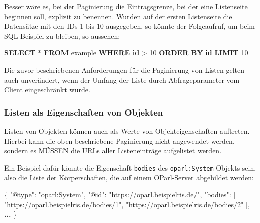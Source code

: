 \documentclass[,a4paper]{article}
\newenvironment{Shaded}{}{}
\newcommand{\KeywordTok}[1]{\textcolor[rgb]{0.00,0.44,0.13}{\textbf{{#1}}}}
\newcommand{\DataTypeTok}[1]{\textcolor[rgb]{0.56,0.13,0.00}{{#1}}}
\newcommand{\DecValTok}[1]{\textcolor[rgb]{0.25,0.63,0.44}{{#1}}}
\newcommand{\StringTok}[1]{\textcolor[rgb]{0.25,0.44,0.63}{{#1}}}
\newcommand{\OtherTok}[1]{\textcolor[rgb]{0.00,0.44,0.13}{{#1}}}
\newcommand{\FunctionTok}[1]{\textcolor[rgb]{0.02,0.16,0.49}{{#1}}}
\newcommand{\ErrorTok}[1]{\textcolor[rgb]{1.00,0.00,0.00}{\textbf{{#1}}}}
\newcommand{\NormalTok}[1]{{#1}}
\begin{document}
Besser wäre es, bei der Paginierung die Eintragsgrenze, bei der eine
Listenseite beginnen soll, explizit zu benennen. Wurden auf der ersten
Listenseite die Datensätze mit den IDs 1 bis 10 ausgegeben, so könnte
der Folgeaufruf, um beim SQL-Beispiel zu bleiben, so aussehen:

\begin{Shaded}
\begin{Highlighting}[]
\KeywordTok{SELECT} \NormalTok{* }\KeywordTok{FROM} \NormalTok{example }\KeywordTok{WHERE} \KeywordTok{id} \NormalTok{> }\DecValTok{10} \KeywordTok{ORDER} \KeywordTok{BY} \KeywordTok{id} \KeywordTok{LIMIT} \DecValTok{10}
\end{Highlighting}
\end{Shaded}

Die zuvor beschriebenen Anforderungen für die Paginierung von Listen
gelten auch unverändert, wenn der Umfang der Liste durch
Abfrageparameter vom Client eingeschränkt wurde.

\subsubsection{Listen als Eigenschaften von
Objekten}\label{listen-als-eigenschaften-von-objekten}

Listen von Objekten können auch als Werte von Objekteigenschaften
auftreten. Hierbei kann die oben beschriebene Paginierung nicht
angewendet werden, sondern es MÜSSEN die URLs aller Listeneinträge
aufgelistet werden.

Ein Beispiel dafür könnte die Eigenschaft \texttt{bodies} des
\texttt{oparl:System} Objekts sein, also die Liste der Körperschaften,
die auf einem OParl-Server abgebildet werden:

\begin{Shaded}
\begin{Highlighting}[]
\FunctionTok{\{}
    \DataTypeTok{"@type"}\FunctionTok{:} \StringTok{"oparl:System"}\FunctionTok{,}
    \DataTypeTok{"@id"}\FunctionTok{:} \StringTok{"https://oparl.beispielris.de/"}\FunctionTok{,}
    \DataTypeTok{"bodies"}\FunctionTok{:} \OtherTok{[}
        \StringTok{"https://oparl.beispielris.de/bodies/1"}\OtherTok{,}
        \StringTok{"https://oparl.beispielris.de/bodies/2"}
    \OtherTok{]}\FunctionTok{,}
    \ErrorTok{...}
\FunctionTok{\}}
\end{Highlighting}
\end{Shaded}
\end{document}

